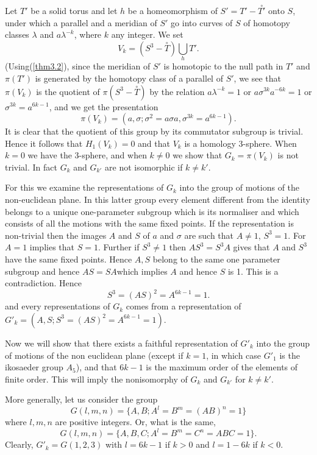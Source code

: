 Let $T'$ be a solid torus and let $h$ be a homeomorphism of $S' = T' -
\overset{\circ}{T'}$ onto $S$, under which a parallel and a meridian of
$S'$ go into curves of $S$ of homotopy classes $\lambda$ and $a
\lambda^{-k}$, where $k$ any integer. We set 
$$
V_k = (S^3 - \overset{\circ}{T}) \bigcup_h T'.
$$
(Using\pageoriginale (\ref{thm3.2}), since the meridian of $S'$ is homotopic to
the null path in $T'$ and $\pi (T')$ is generated by the homotopy
class of a parallel of $S'$, we see that $\pi (V_k)$ is the quotient
of $\pi (S^3 -\overset{\circ}{T})$ by the relation $a \lambda^{-k} = 1$ or
$a \sigma^{3k}  a^{-6k}=1$ or $\sigma^{3k} = a^{6k-1}$, and we get the
presentation  
$$ 
\pi (V_k) = (a, \sigma ; \sigma^2 = a \sigma a, \sigma^{3k} = a^{6k 
  -1}). 
$$
It is clear that the quotient of this group by its commutator subgroup
is trivial. Hence it follows that $H_1 (V_k) = 0$ and that $V_k$ is a
homology 3-sphere. When $k = 0$ we have the 3-sphere, and when $k \neq
0$ we show that $G_k = \pi (V_k)$ is not trivial. In fact $G_k$ and
$G_{k'}$ are not isomorphic if $k \neq k'$. 

For this we examine the representations of $G_k$ into the group of
motions of the non-euclidean plane. In this latter group every
element different from the identity belongs to a unique one-parameter
subgroup which is its normaliser and which consists of all the motions
with the same fixed points. If the representation is non-trivial then
the images $A$ and $S$ of $a$ and $\sigma$ are such that $A \neq 1$,
$S^3 = 1$. For $A = 1$ implies that $S = 1$. Further if $S^3 \neq 1$
then $AS^3 = S^3 A$ gives that $A$ and $S^3$ have the same fixed
points. Hence $A, S$ belong to the same one parameter subgroup and
hence $AS = SA$\pageoriginale which implies $A$ and hence $S$ is
1. This is a contradiction. Hence  
$$
S^3 = (AS)^2 = A^{6k -1} = 1. 
$$
and every representations of $G_k$ comes from a representation of
$G'_k = (A,S; S^3 = (AS)^2 = A^{6k -1} =1)$. 

Now we will show that there exists a faithful representation of $G'_k$
into the group of motions of the non euclidean plane (except if $k
=1$, in which case $G'_1$ is the ikosaeder group $A_5$), and that
$6k-1$ is the maximum order of the elements of finite order. This will
imply the nonisomorphy of $G_k$ and $G_{k'}$ for $k \neq k'$. 

More generally, let us consider the group
\begin{equation*}
G(l,m,n) = \{ A,B; A^l = B^m = (AB)^n = 1 \} \tag{1}\label{eq1}
 \end{equation*} 
 where $l, m, n$ are positive integers. Or, what is the same,
 $$
 G(l,m,n) = \{ A,B,C; A^l = B^m = C^n = ABC = 1 \}.
 $$ 
 Clearly, $G'_k = G(1,2,3)$ with $l = 6k -1$ if $k > 0$ and $l = 1-6k$ if
 $k < 0$. 
 
